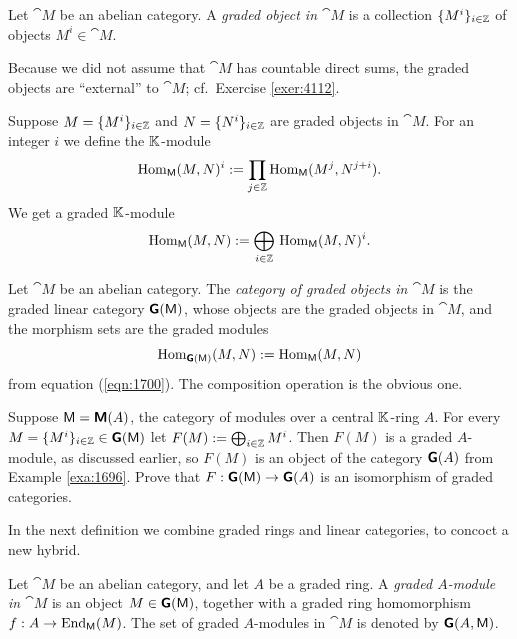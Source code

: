 \begin{dfn}  \label{dfn:1700}
Let $\cat{M}$ be an abelian category. 
A {\em graded object in $\cat{M}$}%
is a collection 
$\{ M^i \}_{i \in \mathbb{Z}}$ of objects $M^i \in \cat{M}$.
\end{dfn}

Because we did not assume that $\cat{M}$ has countable direct sums, the graded 
objects are ``external'' to $\cat{M}$; cf.\ Exercise \ref{exer:4112}.

Suppose $M = \{ M^i \}_{i \in \mathbb{Z}}$ and $N = \{ N^i \}_{i \in \mathbb{Z}}$
are graded objects in $\cat{M}$. For an integer $i$ we define the $\mathbb{K}$-module
\begin{equation} \label{eqn:2495}
\operatorname{Hom}_{\operatorname{\mathsf{M}}}(M, N)^i := \prod_{j \in \mathbb{Z}} 
\operatorname{Hom}_{\operatorname{\mathsf{M}}}(M^j, N^{j + i}) .
\end{equation}
We get a graded $\mathbb{K}$-module 
\begin{equation} \label{eqn:1700}
\operatorname{Hom}_{\operatorname{\mathsf{M}}}(M, N) := \bigoplus_{i \in \mathbb{Z}} \,
\operatorname{Hom}_{\operatorname{\mathsf{M}}}(M, N)^i . 
\end{equation}

\begin{dfn}  \label{dfn:1701}
Let $\cat{M}$ be an abelian category. 
The {\em category of graded objects in $\cat{M}$} is the graded linear 
category $\boldsymbol{\mathsf{G}}(\operatorname{\mathsf{M}})$, whose objects are the graded objects 
in $\cat{M}$, and the morphism sets are the graded modules 
\[ \operatorname{Hom}_{\boldsymbol{\mathsf{G}}(\operatorname{\mathsf{M}})}(M, N) := \operatorname{Hom}_{\operatorname{\mathsf{M}}}(M, N) \]
from equation (\ref{eqn:1700}). 
The composition operation is the obvious one. 
\end{dfn}

\begin{exer}  \label{exer:4112}
Suppose $\operatorname{\mathsf{M}} = \boldsymbol{\mathsf{M}}(A)$, the category of modules over a 
central $\mathbb{K}$-ring $A$. For every 
$M = \{ M^i \}_{i \in \mathbb{Z}} \in \boldsymbol{\mathsf{G}}(\operatorname{\mathsf{M}})$ let 
$F(M) := \bigoplus_{i \in \mathbb{Z}} M^i$.
Then $F(M)$ is a graded $A$-module, as discussed earlier, so $F(M)$ is an 
object of the category $\boldsymbol{\mathsf{G}}(A)$ from Example \ref{exa:1696}.
Prove that 
$F : \boldsymbol{\mathsf{G}}(\operatorname{\mathsf{M}}) \to \boldsymbol{\mathsf{G}}(A)$
is an isomorphism of graded categories. 
\end{exer}

In the next definition we combine graded rings and linear categories, to 
concoct a new hybrid.

\begin{dfn} \label{dfn:1702}
Let $\cat{M}$ be an abelian category, and let $A$ be a graded ring. A 
{\em graded $A$-module in  $\cat{M}$}%
is an object 
$M \in \boldsymbol{\mathsf{G}}(\operatorname{\mathsf{M}})$, together with a graded ring homomorphism 
$f : A \to \operatorname{End}_{\operatorname{\mathsf{M}}}(M)$. 
The set of graded $A$-modules in $\cat{M}$ is denoted by 
$\boldsymbol{\mathsf{G}}(A, \operatorname{\mathsf{M}})$. 
\end{dfn}

